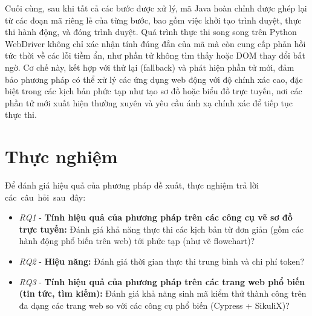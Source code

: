 \documentclass[a4paper, 12pt]{report}
\begin{document}
{%
Cuối cùng, sau khi tất cả các bước được xử lý, mã Java hoàn chỉnh được ghép lại từ các đoạn mã riêng lẻ của từng bước, bao gồm việc khởi tạo trình duyệt, thực thi hành động, và đóng trình duyệt. Quá trình thực thi song song trên Python WebDriver không chỉ xác nhận tính đúng đắn của mã mà còn cung cấp phản hồi tức thời về các lỗi tiềm ẩn, như phần tử không tìm thấy hoặc DOM thay đổi bất ngờ. Cơ chế này, kết hợp với thử lại (fallback) và phát hiện phần tử mới, đảm bảo phương pháp có thể xử lý các ứng dụng web động với độ chính xác cao, đặc biệt trong các kịch bản phức tạp như tạo sơ đồ hoặc biểu đồ trực tuyến, nơi các phần tử mới xuất hiện thường xuyên và yêu cầu ánh xạ chính xác để tiếp tục thực thi.





\chapter{Thực nghiệm}
Để đánh giá hiệu quả của phương pháp đề xuất, thực nghiệm trả lời các~câu~hỏi~sau~đây:

\begin{itemize}
    \item \textit{RQ1} - \textbf{Tính hiệu quả của phương pháp trên các công cụ vẽ sơ đồ trực tuyến:} Đánh giá khả năng thực thi các kịch bản từ đơn giản (gồm các hành động phổ biến trên web) tới phức tạp (như vẽ flowchart)?

    \item \textit{RQ2} - \textbf{Hiệu năng:} Đánh giá thời gian thực thi trung bình và chi phí token?

    \item \textit{RQ3} - \textbf{Tính hiệu quả của phương pháp trên các trang web phổ biến (tin tức, tìm kiếm):} Đánh giá khả năng sinh mã kiểm thử thành công trên đa dạng các trang web so với các công cụ phổ biến (Cypress + SikuliX)?


\end{itemize}}
\end{document}
